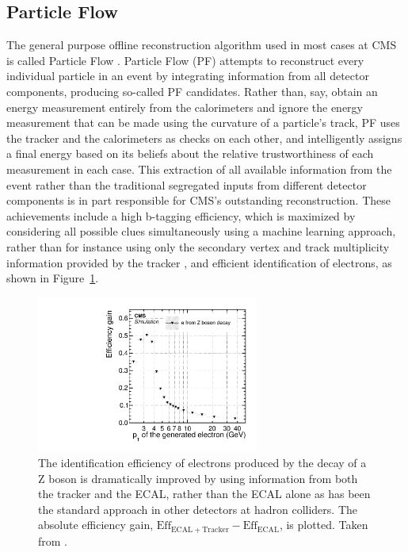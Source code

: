   \subsection{Particle Flow} \label{sec:particleflow}

  The general purpose offline reconstruction algorithm used in most cases at CMS is called Particle Flow \cite{particleflow}.
  Particle Flow (PF) attempts to reconstruct every individual particle in an event by integrating information from all detector components, producing so-called PF candidates.
  Rather than, say, obtain an energy measurement entirely from the calorimeters and ignore the energy measurement that can be made using the curvature of a particle's track, PF uses the tracker and the calorimeters as checks on each other, and intelligently assigns a final energy based on its beliefs about the relative trustworthiness of each measurement in each case.
  This extraction of all available information from the event rather than the traditional segregated inputs from different detector components is in part responsible for CMS's outstanding reconstruction.
  These achievements include a high b-tagging efficiency, which is maximized by considering all possible clues simultaneously using a machine learning approach, rather than for instance using only the secondary vertex and track multiplicity information provided by the tracker \cite{particleflow}, and efficient identification of electrons, as shown in Figure~\ref{fig:PFimprovement}.
  
    \begin{figure}[h!]
      \centering
      \includegraphics[width=0.65\textwidth]{figures/pfimprovement.pdf}
      \caption[Improvement of electron identification efficiency as a function of \pt using an integrated reconstruction approach like Particle Flow.]{
        The identification efficiency of electrons produced by the decay of a Z boson is dramatically improved by using information from both the tracker and the ECAL, rather than the ECAL alone as has been the standard approach in other detectors at hadron colliders.
        The absolute efficiency gain, $\mathrm{Eff}_{\mathrm{ECAL}+\mathrm{Tracker}}-\mathrm{Eff}_{\mathrm{ECAL}}$, is plotted.
        Taken from \cite{particleflow}.}
      \label{fig:PFimprovement}
    \end{figure}  


